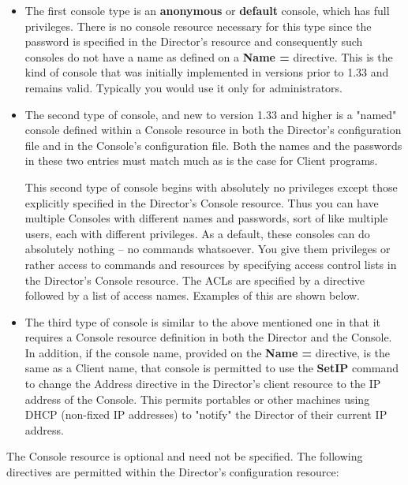 \begin{itemize}
\item The first console type is an {\bf anonymous} or {\bf default}  console,
   which has full privileges.  There is no console resource necessary for
   this type since the password is specified in the Director's resource and
   consequently such consoles do not have a name as defined on a {\bf Name
   =} directive.  This is the kind of console that was initially
   implemented in versions prior to 1.33 and remains valid.  Typically you
   would use it only for  administrators.  

\item The second type of console, and new to version 1.33 and  higher is a
   "named" console defined within a Console resource in both the Director's
   configuration file and in the Console's configuration file.  Both the
   names and the passwords in these two entries must match much as is the
   case for Client programs.

   This second type of console begins with absolutely no privileges except
   those explicitly specified in the Director's Console resource.  Thus you
   can have multiple Consoles with different names and passwords, sort of
   like multiple users, each with different privileges.  As a default,
   these consoles can do absolutely nothing -- no commands whatsoever.  You
   give them privileges or rather access to commands and resources by
   specifying access control lists in the Director's Console resource.  The
   ACLs are specified by a directive followed by a list of access names.
   Examples of this are shown below.

\item The third type of console is similar to the above mentioned  one in that
   it requires a Console resource definition in both the Director and the
   Console.  In addition, if the console name, provided on the {\bf Name =}
   directive, is the same as a Client name, that console is permitted to
   use the {\bf SetIP} command to change the Address directive in the
   Director's client resource to the IP address of the Console.  This
   permits portables or other machines using DHCP (non-fixed IP addresses)
   to "notify" the Director of their current IP address.
\end{itemize}

The Console resource is optional and need not be specified. The following
directives are permitted within the Director's configuration resource: 

